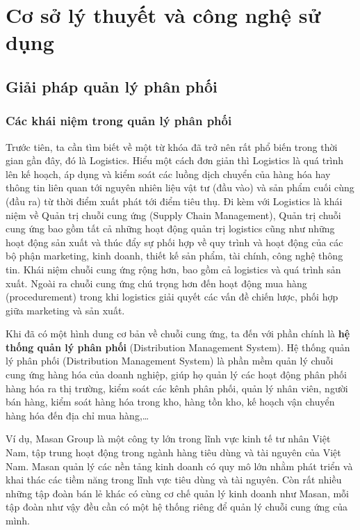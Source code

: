 \chapter{Cơ sở lý thuyết và công nghệ sử dụng}

\section{Giải pháp quản lý phân phối}
\subsection{Các khái niệm trong quản lý phân phối}
Trước tiên, ta cần tìm biết về một từ khóa đã trở nên rất
phổ biến trong thời gian gần đây, đó là Logistics. Hiểu một cách đơn
giản thì Logistics là quá trình lên kế hoạch, áp dụng và kiểm soát
các luồng dịch chuyển của hàng hóa hay thông tin liên quan tới nguyên
nhiên liệu vật tư (đầu vào) và sản phẩm cuối cùng (đầu ra) từ thời
điểm xuất phát tới điểm tiêu thụ. Đi kèm với Logistics là khái niệm
về Quản trị chuỗi cung ứng (Supply Chain Management), Quản trị chuỗi
cung ứng bao gồm tất cả những hoạt động quản trị logistics cũng như
những hoạt động sản xuất và thúc đẩy sự phối hợp về quy trình và
hoạt động của các bộ phận marketing, kinh doanh, thiết kế sản phẩm,
tài chính, công nghệ thông tin. Khái niệm chuỗi cung ứng rộng hơn,
bao gồm cả logistics và quá trình sản xuất. Ngoài ra chuỗi cung ứng
chú trọng hơn đến hoạt động mua hàng (procedurement) trong khi
logistics giải quyết các vấn đề chiến lược, phối hợp giữa marketing và
sản xuất.

Khi đã có một hình dung cơ bản về chuỗi cung ứng, ta đến với
phần chính là \textbf{hệ thống quản lý phân phối}
(Distribution Management System). Hệ thống quản lý phân phối
(Distribution Management System) là phần mềm quản lý chuỗi
cung ứng hàng hóa của doanh nghiệp, giúp họ quản lý các hoạt
động phân phối hàng hóa ra thị trường, kiểm soát các kênh phân
phối, quản lý nhân viên, người bán hàng, kiểm soát hàng hóa
trong kho, hàng tồn kho, kế hoạch vận chuyển
hàng hóa đến địa chỉ mua hàng,…

Ví dụ, Masan Group là một công ty lớn trong lĩnh vực kinh tế
tư nhân Việt Nam, tập trung hoạt động trong ngành hàng tiêu dùng và
tài nguyên của Việt Nam. Masan quản lý các nền tảng kinh doanh có
quy mô lớn nhằm phát triển và khai thác các tiềm năng trong lĩnh vực
tiêu dùng và tài nguyên. Còn rất nhiều những tập đoàn bán lẻ khác
có cùng cơ chế quản lý kinh doanh như Masan, mỗi tập đoàn như vậy đều
cần có một hệ thống riêng để quản lý chuỗi cung ứng của mình.

